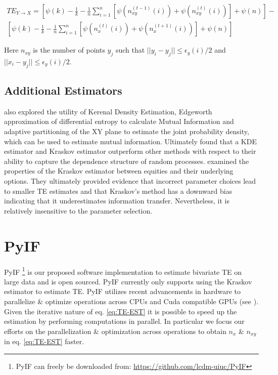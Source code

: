 \setlength{\arraycolsep}{0.0em}
\begin{eqnarray}
TE_{Y \rightarrow X} =  \left[  \psi(k) - \frac{1}{k} - \frac{1}{n}  \sum_{i=1}^n [ \psi(n_{xy}^{(t-1)}(i)) + \psi(n_{xy}^{(t)}(i) ) ] + \psi(n) \right]   -  \nonumber\\
\left[  \psi(k) - \frac{1}{k} - \frac{1}{n}  \sum_{i=1}^n [ \psi(n_{x}^{(t)}(i)) + \psi(n_{x}^{(t+1)}(i) ) ] + \psi(n) \right]
\label{eq:TE-EST}
\end{eqnarray}
\setlength{\arraycolsep}{1pt}

\noindent  Here \(n_{xy}\) is the number of points \(y_j\) such that \(||y_i - y_j  || \leq \epsilon_y(i)/2\) and \(||x_i - y_j  || \leq \epsilon_y(i)/2\).

\subsection{Additional Estimators}
\cite{EstimatingTE} also explored the utility of Kerenal Density Estimation, Edgeworth approximation of differential entropy to calculate Mutual Information and adaptive partitioning of the XY plane to estimate the joint probability density, which can be used to estimate mutual information. Ultimately \cite{EstimatingTE} found that a KDE estimator and Kraskov estimator outperform  other methods  with respect to their ability to capture the dependence structure of random processes. \cite{JeffTE} examined the properties of the Kraskov estimator between equities and their underlying options. They ultimately provided evidence  that incorrect parameter choices lead to smaller TE estimates and that Kraskov's method has a downward bias indicating that it underestimates information transfer. Nevertheless, it is relatively insensitive to the parameter selection. 

\section{PyIF}

PyIF \footnote{PyIF can freely be downloaded from: \url{https://github.com/lcdm-uiuc/PyIF}} is our proposed software implementation  to estimate bivariate TE on large data and is open sourced.  PyIF currently only supports using the Kraskov estimator to estimate TE.  PyIF utilizes recent advancements in hardware to parallelize \& optimize operations across CPUs and Cuda compatible GPUs (see  \cite{CUDA}).  Given the iterative nature of eq. \ref{eq:TE-EST} it is possible to speed up the estimation by performing computations in parallel. In particular we focus our efforts on the parallelization \& optimization across operations to obtain \(n_x\)  \& \(n_{xy}\) in eq. \ref{eq:TE-EST} faster.

